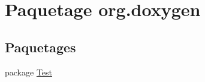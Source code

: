 \hypertarget{namespaceorg_1_1doxygen}{}\section{Paquetage org.\+doxygen}
\label{namespaceorg_1_1doxygen}
\subsection*{Paquetages}
\begin{DoxyCompactItemize}
\item 
package \hyperlink{namespaceorg_1_1doxygen_1_1_test}{Test}
\end{DoxyCompactItemize}
